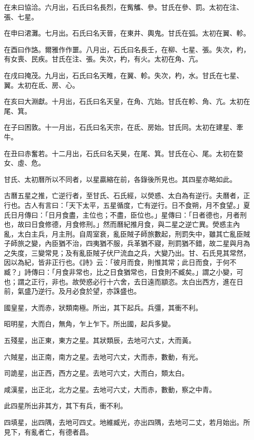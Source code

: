 \begin{pinyinscope}
在未曰協洽。六月出，石氏曰名長烈，在觜觿、參。甘氏在參、罰。太初在注、張、七星。

在申曰涒灘。七月出。石氏曰名天晉，在東井、輿鬼。甘氏在弧。太初在翼、軫。

在酉曰作詻。爾雅作作噩。八月出，石氏曰名長壬，在柳、七星、張。失次，杓，有女喪、民疾。甘氏在注、張。失次，杓，有火。太初在角、亢。

在戌曰掩茂。九月出，石氏曰名天睢，在翼、軫。失次，杓，水。甘氏在七星、翼。太初在氐、房、心。

在亥曰大淵獻。十月出，石氏曰名天皇，在角、亢始。甘氏在軫、角、亢。太初在尾、箕。

在子曰困敦。十一月出，石氏曰名天宗，在氐、房始。甘氏同。太初在建星、牽牛。

在丑曰赤奮若。十二月出，石氏曰名天昊，在尾、箕。甘氏在心、尾。太初在婺女、虛、危。

甘氏、太初曆所以不同者，以星贏縮在前，各錄後所見也。其四星亦略如此。

古曆五星之推，亡逆行者，至甘氏、石氏經，以熒惑、太白為有逆行。夫曆者，正行也。古人有言曰：「天下太平，五星循度，亡有逆行。日不食朔，月不食望。」夏氏日月傳曰：「日月食盡，主位也；不盡，臣位也。」星傳曰：「日者德也，月者刑也，故曰日食修德，月食修刑。」然而曆紀推月食，與二星之逆亡異。熒惑主內亂，太白主兵，月主刑。自周室衰，亂臣賊子師旅數起，刑罰失中，雖其亡亂臣賊子師旅之變，內臣猶不治，四夷猶不服，兵革猶不寢，刑罰猶不錯，故二星與月為之失度，三變常見；及有亂臣賊子伏尸流血之兵，大變乃出。甘、石氏見其常然，因以為紀，皆非正行也。《詩》云：「彼月而食，則惟其常；此日而食，于何不臧？」詩傳曰：「月食非常也，比之日食猶常也，日食則不臧矣。」謂之小變，可也；謂之正行，非也。故熒惑必行十六舍，去日遠而顓恣。太白出西方，進在日前，氣盛乃逆行。及月必食於望，亦誅盛也。

國皇星，大而赤，狀類南極。所出，其下起兵。兵彊，其衝不利。

昭明星，大而白，無角，乍上乍下。所出國，起兵多變。

五殘星，出正東，東方之星。其狀類辰，去地可六丈，大而黃。

六賊星，出正南，南方之星。去地可六丈，大而赤，數動，有光。

司詭星，出正西，西方之星。去地可六丈，大而白，類太白。

咸漢星，出正北，北方之星。去地可六丈，大而赤，數動，察之中青。

此四星所出非其方，其下有兵，衝不利。

四填星，出四隅，去地可四丈。地維臧光，亦出四隅，去地可二丈，若月始出。所見下，有亂者亡，有德者昌。


\end{pinyinscope}
